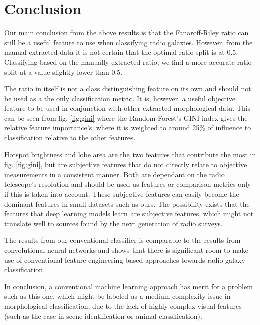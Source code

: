\documentclass[conference]{IEEEtran}
\begin{document}
\section{Conclusion}

Our main conclusion from the above results is that the Fanaroff-Riley ratio can still be a useful feature to use when classifying radio galaxies. However, from the manual extracted data it is not certain that the optimal ratio split is at 0.5. Classifying based on the manually extracted ratio, we find a more accurate ratio split at a value slightly lower than 0.5.

The ratio in itself is not a class distinguishing feature on its own and should not be used as a the only classification metric. It is, however, a useful objective feature to be used in conjunction with other extracted morphological data. This can be seen from fig. \ref{fig:gini} where the Random Forest's GINI index gives the relative feature importance's, where it is weighted to around 25\% of influence to classification relative to the other features.

Hotspot brightness and lobe area are the two features that contribute the most in fig. \ref{fig:gini}, but are subjective features that do not directly relate to objective measurements in a consistent manner. Both are dependant on the radio telescope's resolution and should be used as features or comparison metrics only if this is taken into account. These subjective features can easily become the dominant features in small datasets such as ours. The possibility exists that the features that deep learning models learn are subjective features, which might not translate well to sources found by the next generation of radio surveys.

The results from our conventional classifier is comparable to the results from convolutional neural networks and shows that there is significant room to make use of conventional feature engineering based approaches towards radio galaxy classification. 


In conclusion, a conventional machine learning approach has merit for a problem such as this one, which might be labeled as a medium complexity issue in morphological classification, due to the lack of highly complex visual features (such as the case in scene identification or animal classification). 
\end{document}

